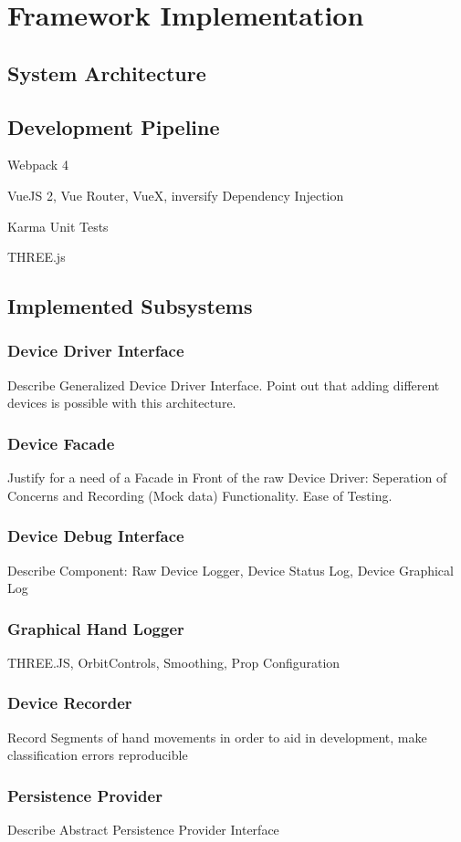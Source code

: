 \chapter{Framework Implementation}
\label{sec:impl}
\section{System Architecture}
\section{Development Pipeline}
Webpack 4

VueJS 2, Vue Router, VueX, inversify Dependency Injection

Karma Unit Tests

THREE.js
\section{Implemented Subsystems}
\subsection{Device Driver Interface}
Describe Generalized Device Driver Interface. Point out that adding different devices is possible with this architecture.
\subsection{Device Facade}
Justify for a need of a Facade in Front of the raw Device Driver: Seperation of Concerns and Recording (Mock data) Functionality. Ease of Testing.
\subsection{Device Debug Interface}
Describe Component: Raw Device Logger, Device Status Log, Device Graphical Log
\subsection{Graphical Hand Logger}
THREE.JS, OrbitControls, Smoothing, Prop Configuration
\subsection{Device Recorder}
Record Segments of hand movements in order to aid in development, make classification errors reproducible
\subsection{Persistence Provider}
Describe Abstract Persistence Provider Interface

